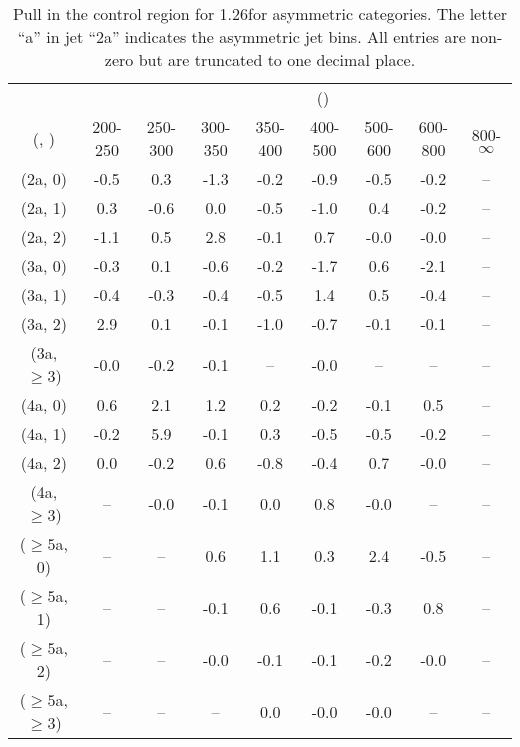 \begin{table}[h!]
\tiny
\centering
\caption{Pull in the \mmj control region for 1.26\ifb for asymmetric categories. The letter ``a'' in jet \eg ``2a''  indicates the asymmetric jet bins. All entries are non-zero but are truncated to one decimal place.\label{tab:pullsep_mumu_ewk_asym}}
\begin{tabular}
{ccccccccc}
	\hline\hline
&	& \multicolumn{8}{c}{\scalht (\gev)} \\ 
	 (\njet,  \nb) & 200-250 & 250-300 & 300-350 & 350-400 & 400-500 & 500-600 & 600-800 & 800-$\infty$ \\ [0.8ex] 
\hline
	(2a, 0) & -0.5 & 0.3 & -1.3 & -0.2 & -0.9 & -0.5 & -0.2 & -- \\[0.5ex] 
	(2a, 1) & 0.3 & -0.6 & 0.0 & -0.5 & -1.0 & 0.4 & -0.2 & -- \\[0.5ex] 
	(2a, 2) & -1.1 & 0.5 & 2.8 & -0.1 & 0.7 & -0.0 & -0.0 & -- \\[0.5ex] 
	(3a, 0) & -0.3 & 0.1 & -0.6 & -0.2 & -1.7 & 0.6 & -2.1 & -- \\[0.5ex] 
	(3a, 1) & -0.4 & -0.3 & -0.4 & -0.5 & 1.4 & 0.5 & -0.4 & -- \\[0.5ex] 
	(3a, 2) & 2.9 & 0.1 & -0.1 & -1.0 & -0.7 & -0.1 & -0.1 & -- \\[0.5ex] 
	(3a, $\ge3$) & -0.0 & -0.2 & -0.1 & -- & -0.0 & -- & -- & -- \\[0.5ex] 
	(4a, 0) & 0.6 & 2.1 & 1.2 & 0.2 & -0.2 & -0.1 & 0.5 & -- \\[0.5ex] 
	(4a, 1) & -0.2 & 5.9 & -0.1 & 0.3 & -0.5 & -0.5 & -0.2 & -- \\[0.5ex] 
	(4a, 2) & 0.0 & -0.2 & 0.6 & -0.8 & -0.4 & 0.7 & -0.0 & -- \\[0.5ex] 
	(4a, $\ge3$) & -- & -0.0 & -0.1 & 0.0 & 0.8 & -0.0 & -- & -- \\[0.5ex] 
	($\ge5$a, 0) & -- & -- & 0.6 & 1.1 & 0.3 & 2.4 & -0.5 & -- \\[0.5ex] 
	($\ge5$a, 1) & -- & -- & -0.1 & 0.6 & -0.1 & -0.3 & 0.8 & -- \\[0.5ex] 
	($\ge5$a, 2) & -- & -- & -0.0 & -0.1 & -0.1 & -0.2 & -0.0 & -- \\[0.5ex] 
	($\ge5$a, $\ge3$) & -- & -- & -- & 0.0 & -0.0 & -0.0 & -- & -- \\[0.5ex] 
	\hline
	\hline
\end{tabular}
\end{table}
